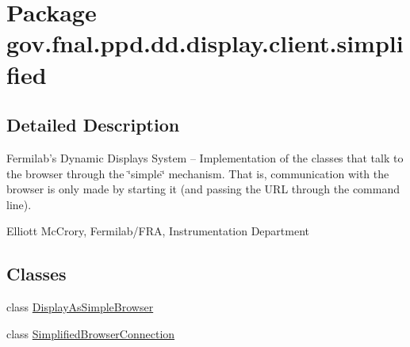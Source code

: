 \hypertarget{namespacegov_1_1fnal_1_1ppd_1_1dd_1_1display_1_1client_1_1simplified}{\section{Package gov.\-fnal.\-ppd.\-dd.\-display.\-client.\-simplified}
\label{namespacegov_1_1fnal_1_1ppd_1_1dd_1_1display_1_1client_1_1simplified}
}


\subsection{Detailed Description}
Fermilab's Dynamic Displays System -- Implementation of the classes that talk to the browser through the \char`\"{}simple\char`\"{} mechanism. That is, communication with the browser is only made by starting it (and passing the U\-R\-L through the command line). 

Elliott Mc\-Crory, Fermilab/\-F\-R\-A, Instrumentation Department \subsection*{Classes}
\begin{DoxyCompactItemize}
\item 
class \hyperlink{classgov_1_1fnal_1_1ppd_1_1dd_1_1display_1_1client_1_1simplified_1_1DisplayAsSimpleBrowser}{Display\-As\-Simple\-Browser}
\item 
class \hyperlink{classgov_1_1fnal_1_1ppd_1_1dd_1_1display_1_1client_1_1simplified_1_1SimplifiedBrowserConnection}{Simplified\-Browser\-Connection}
\end{DoxyCompactItemize}
